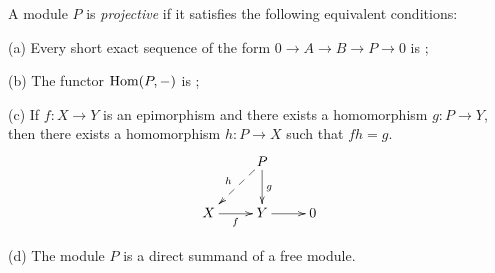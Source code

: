 \documentclass{article}
\begin{document}
A module $P$ is {\it projective}
if it satisfies the following equivalent conditions:

(a) Every short exact sequence
of the form $0 \to A \to B \to P \to 0$ 
is ;

(b) The functor ${\rm Hom}(P, -)$ 
is ;

(c) If $f : X \to Y$ is an epimorphism
and there exists a homomorphism $g : P \to Y$,
then there exists a homomorphism $h : P \to X$
such that $fh = g$.
$$
\xymatrix{
  &
  P
        \ar@{-->}[dl]_h
        \ar[d]^g
  \\
  X
        \ar[r]_f
  &
  Y
        \ar[r]
  &
  0
}
$$

(d) The module $P$ is a direct summand of a free module.
\end{document}

